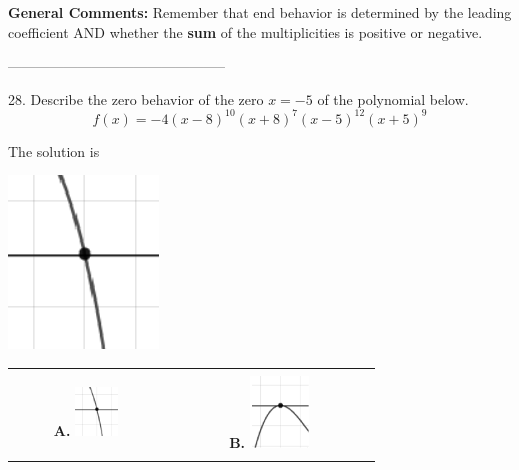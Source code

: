 \documentclass{article}[14pt]
\begin{document}
\textbf{General Comments:} Remember that end behavior is determined by the leading coefficient AND whether the \textbf{sum} of the multiplicities is positive or negative.

-----------------------------------------------

28. Describe the zero behavior of the zero $x = -5$ of the polynomial below.
$$ f(x) = -4(x - 8)^{10}(x + 8)^{7}(x - 5)^{12}(x + 5)^{9} $$ 

 
 The solution is  
 \begin{center} \includegraphics[width=0.3\textwidth]{../Figures/zeroBehaviorNegativeOddB.png} \end{center}\begin{tabular}{|c|c|} 
\hline 
 & \tabularnewline 
 \textbf{A.} \includegraphics[width=0.3\textwidth]{../Figures/zeroBehaviorNegativeOddB.png} & \textbf{B.} \includegraphics[width=0.3\textwidth]{../Figures/zeroBehaviorNegativeEvenB.png} \tabularnewline 
\hline 
 & \tabularnewline 

\end{tabular}
\end{document}
